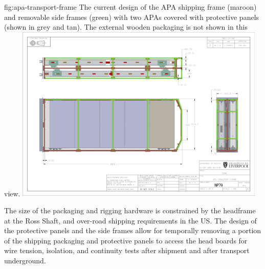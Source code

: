 \begin{dunefigure}{fig:apa-transport-frame}
{The current design of the APA shipping frame (maroon) and removable side frames (green) with two APAs covered with protective panels (shown in grey and tan). The external wooden packaging is not shown in this view.}  
\includegraphics[width=0.9\textwidth]{graphics/sp-apa-transport-box-drawing.png} 
\end{dunefigure}

The size of the packaging and rigging hardware is constrained by the headframe at the Ross Shaft, and over-road shipping requirements in the US. The design of the protective panels and the side frames allow for temporally removing a portion of the shipping packaging and protective panels to access the  head boards for wire tension, isolation, and continuity tests after shipment and after transport underground. 

